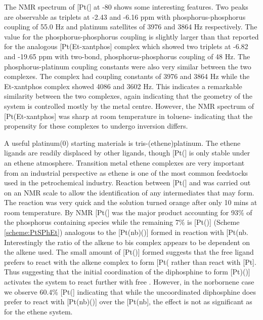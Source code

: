 The \phosphorus{} NMR spectrum of [Pt(\Phthixantphos{}] at -80 \degC{} shows some interesting features.  Two peaks are observable as triplets at -2.43 and -6.16 ppm with phosphorus-phosphorus coupling of 55.0 Hz and platinum satellites of 3976 and 3864 Hz respectively.  The value for the phosphorus-phosphorus coupling is slightly larger than that reported for the analogous [Pt(Et-xantphos] complex which showed two triplets at -6.82 and -19.65 ppm with two-bond, phosphorus-phosphorus coupling of 48 Hz.\cite{Miedanar2004}  The phosphorus-platinum coupling constants were also very similar between the two complexes.  The \Phthixantphos{} complex had coupling constants of 3976 and 3864 Hz while the Et-xantphos complex showed 4086 and 3602 Hz.  This indicates a remarkable similarity between the two complexes, again indicating that the geometry of the system is controlled mostly by the metal centre.  However, the \phosphorus{} NMR spectrum of [Pt(Et-xantphos] was sharp at room temperature in toluene- indicating that the propensity for these complexes to undergo inversion differs.\cite{Miedanar2004}

A useful platinum(0) starting materials is tris-(ethene)platinum.  The ethene ligands are readily displaced by other ligands, though [Pt(] is only stable under an ethene atmosphere. Transition metal ethene complexes are very important from an industrial perspective as ethene is one of the most common feedstocks used in the petrochemical industry.  Reaction between [Pt(] and \Phthixantphos{} was carried out on an NMR scale to allow the identification of any intermediates that may form.  The reaction was very quick and the solution turned orange after only 10 mins at room temperature.  By \phosphorus{} NMR [Pt(\Phthixantphos{}] was the major product accounting for 93\% of the phosphorus containing species while the remaining 7\% is [Pt(\Phthixantphos)] (Scheme \ref{scheme:PtSPhEt}) analogous to the [Pt(nb)(\Phthixantphos)] formed in reaction with [Pt(nb\ce{)3]}.  Interestingly the ratio of the alkene to bis complex appears to be dependent on the alkene used.  The small amount of [Pt(\Phthixantphos)] formed suggests that the free ligand prefers to react with the alkene complex to form [Pt(\Phthixantphos\ce{)2]} rather than react with [Pt].  Thus suggesting that the initial coordination of the diphosphine to form [Pt)(\Phthixantphos)] activates the system to react further with free \Phthixantphos.  However, in the norbornene case we observe 60.4\% [Pt(\Phthixantphos{}] indicating that while the uncoordinated diphosphine does prefer to react with [Pt(nb)(\Phthixantphos)] over the [Pt(nb], the effect is not as significant as for the ethene system.  

